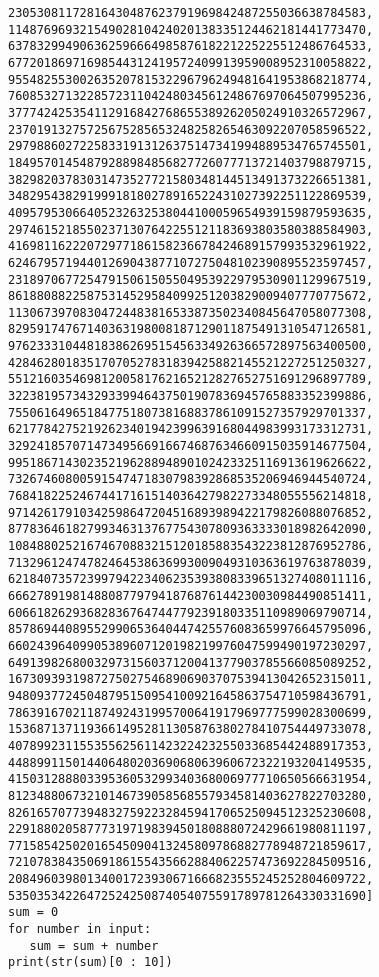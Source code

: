 \documentclass{article}
\begin{document}
\begin{verbatim}
23053081172816430487623791969842487255036638784583,
11487696932154902810424020138335124462181441773470,
63783299490636259666498587618221225225512486764533,
67720186971698544312419572409913959008952310058822,
95548255300263520781532296796249481641953868218774,
76085327132285723110424803456124867697064507995236,
37774242535411291684276865538926205024910326572967,
23701913275725675285653248258265463092207058596522,
29798860272258331913126375147341994889534765745501,
18495701454879288984856827726077713721403798879715,
38298203783031473527721580348144513491373226651381,
34829543829199918180278916522431027392251122869539,
40957953066405232632538044100059654939159879593635,
29746152185502371307642255121183693803580388584903,
41698116222072977186158236678424689157993532961922,
62467957194401269043877107275048102390895523597457,
23189706772547915061505504953922979530901129967519,
86188088225875314529584099251203829009407770775672,
11306739708304724483816533873502340845647058077308,
82959174767140363198008187129011875491310547126581,
97623331044818386269515456334926366572897563400500,
42846280183517070527831839425882145521227251250327,
55121603546981200581762165212827652751691296897789,
32238195734329339946437501907836945765883352399886,
75506164965184775180738168837861091527357929701337,
62177842752192623401942399639168044983993173312731,
32924185707147349566916674687634660915035914677504,
99518671430235219628894890102423325116913619626622,
73267460800591547471830798392868535206946944540724,
76841822524674417161514036427982273348055556214818,
97142617910342598647204516893989422179826088076852,
87783646182799346313767754307809363333018982642090,
10848802521674670883215120185883543223812876952786,
71329612474782464538636993009049310363619763878039,
62184073572399794223406235393808339651327408011116,
66627891981488087797941876876144230030984490851411,
60661826293682836764744779239180335110989069790714,
85786944089552990653640447425576083659976645795096,
66024396409905389607120198219976047599490197230297,
64913982680032973156037120041377903785566085089252,
16730939319872750275468906903707539413042652315011,
94809377245048795150954100921645863754710598436791,
78639167021187492431995700641917969777599028300699,
15368713711936614952811305876380278410754449733078,
40789923115535562561142322423255033685442488917353,
44889911501440648020369068063960672322193204149535,
41503128880339536053299340368006977710650566631954,
81234880673210146739058568557934581403627822703280,
82616570773948327592232845941706525094512325230608,
22918802058777319719839450180888072429661980811197,
77158542502016545090413245809786882778948721859617,
72107838435069186155435662884062257473692284509516,
20849603980134001723930671666823555245252804609722,
53503534226472524250874054075591789781264330331690]
sum = 0
for number in input:
   sum = sum + number
print(str(sum)[0 : 10])
\end{verbatim}
\end{document}
